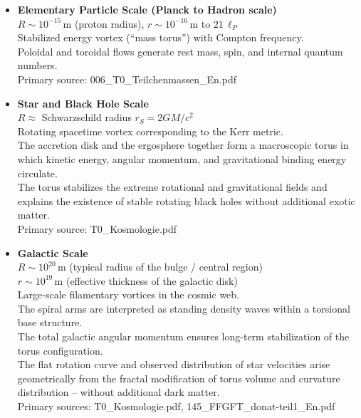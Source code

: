 \documentclass[12pt,a4paper]{article}
\begin{document}
\begin{itemize}
	\item \textbf{Elementary Particle Scale (Planck to Hadron scale)} \\
	$R \sim 10^{-15}\,\text{m}$ (proton radius), $r \sim 10^{-16}\,\text{m}$ to $21\,\ell_P$ \\
	Stabilized energy vortex (``mass torus'') with Compton frequency. \\
	Poloidal and toroidal flows generate rest mass, spin, and internal quantum numbers. \\
	Primary source: 006\_T0\_Teilchenmassen\_En.pdf
	
	\item \textbf{Star and Black Hole Scale} \\
	$R \approx$ Schwarzschild radius $r_S = 2GM/c^2$ \\
	Rotating spacetime vortex corresponding to the Kerr metric. \\
	The accretion disk and the ergosphere together form a macroscopic torus in which kinetic energy, angular momentum, and gravitational binding energy circulate. \\
	The torus stabilizes the extreme rotational and gravitational fields and explains the existence of stable rotating black holes without additional exotic matter. \\
	Primary source: T0\_Kosmologie.pdf
	
	\item \textbf{Galactic Scale} \\
	$R \sim 10^{20}\,\text{m}$ (typical radius of the bulge / central region) \\
	$r \sim 10^{19}\,\text{m}$ (effective thickness of the galactic disk) \\
	Large-scale filamentary vortices in the cosmic web. \\
	The spiral arms are interpreted as standing density waves within a torsional base structure. \\
	The total galactic angular momentum ensures long-term stabilization of the torus configuration. \\
	The flat rotation curve and observed distribution of star velocities arise geometrically from the fractal modification of torus volume and curvature distribution – without additional dark matter. \\
	Primary sources: T0\_Kosmologie.pdf, 145\_FFGFT\_donat-teil1\_En.pdf
	

\end{itemize}
\end{document}
